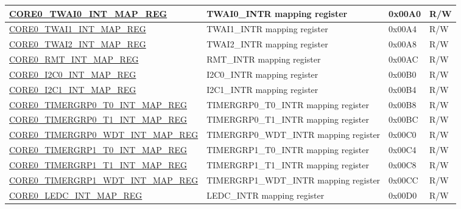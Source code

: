 \begin{longtable}{ | p{7.5cm} | p{7.2cm} | p{1.3cm} | p{1cm} | }
\hyperref[regdesc:CORE0TWAI0INTMAPREG]{CORE0\_TWAI0\_INT\_MAP\_REG} & TWAI0\_INTR mapping register & 0x00A0 & R/W \\ \hline

\hyperref[regdesc:CORE0TWAI1INTMAPREG]{CORE0\_TWAI1\_INT\_MAP\_REG} & TWAI1\_INTR mapping register & 0x00A4 & R/W \\ \hline

\hyperref[regdesc:CORE0TWAI2INTMAPREG]{CORE0\_TWAI2\_INT\_MAP\_REG} & TWAI2\_INTR mapping register & 0x00A8 & R/W \\ \hline

\hyperref[regdesc:CORE0RMTINTMAPREG]{CORE0\_RMT\_INT\_MAP\_REG} & RMT\_INTR mapping register & 0x00AC & R/W \\ \hline

\hyperref[regdesc:CORE0I2C0INTMAPREG]{CORE0\_I2C0\_INT\_MAP\_REG} & I2C0\_INTR mapping register & 0x00B0 & R/W \\ \hline

\hyperref[regdesc:CORE0I2C1INTMAPREG]{CORE0\_I2C1\_INT\_MAP\_REG} & I2C1\_INTR mapping register & 0x00B4 & R/W \\ \hline

\hyperref[regdesc:CORE0TIMERGRP0T0INTMAPREG]{CORE0\_TIMERGRP0\_T0\_INT\_MAP\_REG} & TIMERGRP0\_T0\_INTR mapping register & 0x00B8 & R/W \\ \hline

\hyperref[regdesc:CORE0TIMERGRP0T1INTMAPREG]{CORE0\_TIMERGRP0\_T1\_INT\_MAP\_REG} & TIMERGRP0\_T1\_INTR mapping register & 0x00BC & R/W \\ \hline

\hyperref[regdesc:CORE0TIMERGRP0WDTINTMAPREG]{CORE0\_TIMERGRP0\_WDT\_INT\_MAP\_REG} & TIMERGRP0\_WDT\_INTR mapping register & 0x00C0 & R/W \\ \hline

\hyperref[regdesc:CORE0TIMERGRP1T0INTMAPREG]{CORE0\_TIMERGRP1\_T0\_INT\_MAP\_REG} & TIMERGRP1\_T0\_INTR mapping register & 0x00C4 & R/W \\ \hline

\hyperref[regdesc:CORE0TIMERGRP1T1INTMAPREG]{CORE0\_TIMERGRP1\_T1\_INT\_MAP\_REG} & TIMERGRP1\_T1\_INTR mapping register & 0x00C8 & R/W \\ \hline

\hyperref[regdesc:CORE0TIMERGRP1WDTINTMAPREG]{CORE0\_TIMERGRP1\_WDT\_INT\_MAP\_REG} & TIMERGRP1\_WDT\_INTR mapping register & 0x00CC & R/W \\ \hline

\hyperref[regdesc:CORE0LEDCINTMAPREG]{CORE0\_LEDC\_INT\_MAP\_REG} & LEDC\_INTR mapping register & 0x00D0 & R/W \\ \hline


\end{longtable}
